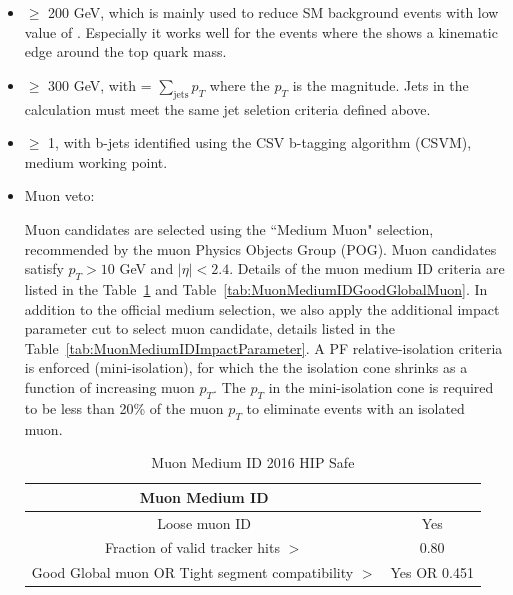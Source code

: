 \begin{itemize}
\item \MTTwo $\ge$ 200 GeV, which is mainly used to reduce SM background events with low value of \MTTwo. Especially it works well for the 
\ttbar events where the \MTTwo shows a kinematic edge around the top quark mass.

\item \HT $\ge$ 300 GeV, with \HT = $\sum_{\mathrm{jets}} p_{T}$ where the $p_{T}$ is the magnitude.
Jets in the \HT calculation must meet the same jet seletion criteria defined above.

\item \nbjets $\ge$ 1, with b-jets identified using the CSV b-tagging algorithm 
(CSVM), medium working point.

\item Muon veto:

Muon candidates are selected using the ``Medium Muon" selection,
recommended by the muon Physics Objects Group (POG).
Muon candidates satisfy $p_{T}>10$ GeV and $|\eta|<2.4$.
Details of the muon medium ID criteria are listed in the Table~\ref{tab:MuonMediumID} and Table~\ref{tab:MuonMediumIDGoodGlobalMuon}.
In addition to the official medium selection, we also apply the additional impact parameter cut to select muon candidate, details listed in the Table~\ref{tab:MuonMediumIDImpactParameter}.
A PF relative-isolation criteria is enforced (mini-isolation), for which the
the isolation cone shrinks as a function of increasing muon $p_{T}$. The $p_{T}$ 
in the mini-isolation cone is required to be less than 20\% of the 
muon $p_{T}$ to eliminate events with an isolated muon. 

\newsavebox{\closureBox}

\begin{table}[htbp]
\fontsize{10 pt}{1.2 em}
\selectfont
\begin{centering}
\caption{\label{tab:MuonMediumID} Muon Medium ID 2016 HIP Safe}
\hspace*{-4ex}
\begin{lrbox}{\closureBox}
\begin{tabular}{|c|c|}
\hline
  Muon Medium ID                                      &               \\
\hline
  Loose muon ID                                       & Yes           \\
\hline
  Fraction of valid tracker hits $>$                  & 0.80          \\
\hline
  Good Global muon OR Tight segment compatibility $>$ & Yes OR 0.451 \\
\hline
\end{tabular}
\end{lrbox}
\scalebox{0.80}{\usebox{\closureBox}}
\par\end{centering}
\end{table}


\end{itemize}
